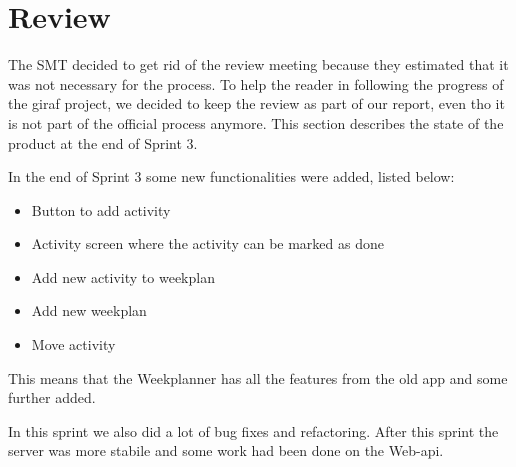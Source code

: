 \section{Review}
The \gls{SMT} decided to get rid of the review meeting because they estimated that it was not necessary for the process. To help the reader in following the progress of the \gls{giraf} project, we decided to keep the review as part of our report, even tho it is not part of the official process anymore. This section describes the state of the product at the end of Sprint 3.

In the end of Sprint 3 some new functionalities were added, listed below:
\begin{itemize}
    \item Button to add activity
    \item Activity screen where the activity can be marked as done
    \item Add new activity to weekplan
    \item Add new weekplan
    \item Move activity
\end{itemize}

This means that the Weekplanner has all the features from the old app and some further added. 

In this sprint we also did a lot of bug fixes and refactoring. After this sprint the server was more stabile and some work had been done on the Web-api.

